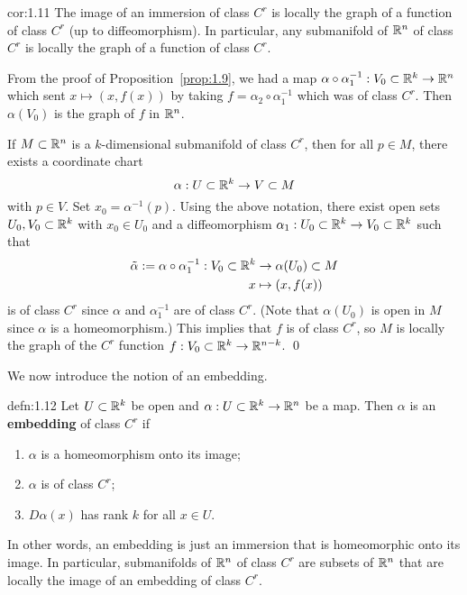 \begin{cor}{cor:1.11}
    The image of an immersion of class $C^r$ is locally the graph of a 
    function of class $C^r$ (up to diffeomorphism). In particular, 
    any submanifold of $\mathbb{R}^n$ of class $C^r$ is locally the graph of a 
    function of class $C^r$.
\end{cor}\vspace{-0.25cm} \newpage
\begin{pf}
    From the proof of Proposition~\ref{prop:1.9}, we had a map
    $\alpha \circ \alpha_1^{-1} : V_0 \subset \mathbb{R}^k \to \mathbb{R}^n$ which sent 
    $x \mapsto (x, f(x))$ by taking $f = \alpha_2 \circ \alpha_1^{-1}$ which 
    was of class $C^r$. Then $\alpha(V_0)$ is the graph of $f$ in $\mathbb{R}^n$. 
    
    If $M \subset \mathbb{R}^n$ is a $k$-dimensional submanifold of class $C^r$, 
    then for all $p \in M$, there exists a coordinate chart 
    \[ \alpha : U \subset \mathbb{R}^k \to V \subset M \] 
    with $p \in V$. Set $x_0 = \alpha^{-1}(p)$. Using the above notation, 
    there exist open sets $U_0, V_0 \subset \mathbb{R}^k$ with $x_0 \in U_0$ 
    and a diffeomorphism $\alpha_1 : U_0 \subset \mathbb{R}^k \to V_0 \subset \mathbb{R}^k$ 
    such that 
    \begin{align*} 
        \tilde\alpha := \alpha \circ \alpha_1^{-1} : V_0 \subset \mathbb{R}^k 
        &\to \alpha(U_0) \subset M \\ 
        x &\mapsto (x, f(x)) 
    \end{align*}
    is of class $C^r$ since $\alpha$ and $\alpha_1^{-1}$ are of 
    class $C^r$. (Note that $\alpha(U_0)$ is open in $M$ since $\alpha$ 
    is a homeomorphism.) This implies that $f$ is of class $C^r$, so $M$ 
    is locally the graph of the $C^r$ function $f : V_0 \subset \mathbb{R}^k \to \mathbb{R}^{n-k}$. \qed 
\end{pf}\vspace{-0.25cm}

We now introduce the notion of an embedding.
\begin{defn}{defn:1.12}
    Let $U \subset \mathbb{R}^k$ be open and $\alpha : U \subset \mathbb{R}^k \to \mathbb{R}^n$ 
    be a map. Then $\alpha$ is an {\bf embedding} of class $C^r$ if 
    \begin{enumerate}[(1)]
        \item $\alpha$ is a homeomorphism onto its image; 
        \item $\alpha$ is of class $C^r$; 
        \item $D\alpha(x)$ has rank $k$ for all $x \in U$. 
    \end{enumerate}
\end{defn}\vspace{-0.25cm}
In other words, an embedding is just an immersion that is homeomorphic onto 
its image. In particular, submanifolds of $\mathbb{R}^n$ of class $C^r$ are subsets 
of $\mathbb{R}^n$ that are locally the image of an embedding of class $C^r$. 

